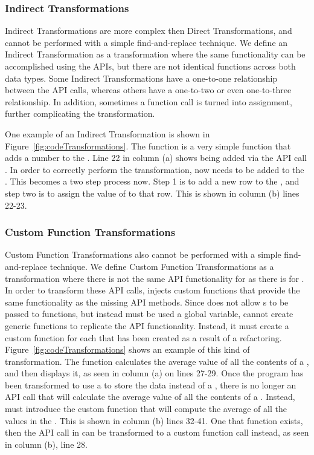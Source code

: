 \documentclass{sigplanconf}
\begin{document}
\subsubsection{Indirect Transformations}
Indirect Transformations are more complex then Direct Transformations, and cannot be performed with a simple find-and-replace technique.  We define an Indirect Transformation as a transformation where the same functionality can be accomplished using the \TD APIs, but there are not identical functions across both data types.  Some Indirect Transformations have a one-to-one relationship between the API calls, whereas others have a one-to-two or even one-to-three relationship.  In addition, sometimes a function call is turned into assignment, further complicating the transformation.  

One example of an Indirect Transformation is shown in Figure~\ref{fig:codeTransformations}.  The function  is a very simple function that adds a number to the  \NC{}. Line 22 in column (a) shows  being added via the API call .
In order to correctly perform the transformation,  now needs to be added to the  .
This becomes a two step process now. Step 1 is to add a new row to the \CDT, and step two is to assign the value of  to that row. This is shown in column (b) lines 22-23.


\subsubsection{Custom Function Transformations}
Custom Function Transformations also cannot be performed with a  simple find-and-replace technique.  We define Custom Function Transformations as 
a transformation where there is not the same API functionality for \CDT as there is for \NC{}.  In order to transform these API calls, \tool injects custom functions that provide the same functionality as the missing API methods.   Since \TD does not allow \CDT{}s to be passed to functions, but instead must be used a global variable, \tool cannot create generic functions to replicate the API functionality.  Instead, it must create a custom function for each \CDT that has been created as a result of a refactoring.
Figure~\ref{fig:codeTransformations} shows an example of this kind of transformation.  The function  calculates the average value of all the contents of a \NC{}, and then displays it, as seen in column (a) on lines 27-29.  Once the program has been transformed to use a \CDT to store the data instead of a \NC, there is no longer an API call that will calculate the average value of all the contents of a \CDT. Instead, \tool must introduce the custom function  that will compute the average of all the values in the .  This is shown in column (b) lines 32-41.  One that function exists, then the API call in  can be transformed to a custom function call instead, as seen in column (b), line 28.
\end{document}
